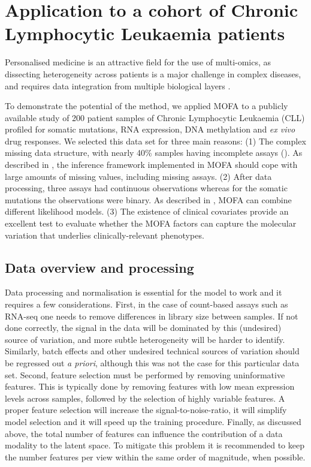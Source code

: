 \newpage

\section{Application to a cohort of Chronic Lymphocytic Leukaemia patients} \label{section:mofa_cll}

Personalised medicine is an attractive field for the use of multi-omics, as dissecting heterogeneity across patients is a major challenge in complex diseases, and requires data integration from multiple biological layers \cite{Chen2013,Costello2014,Alyass2015}.

To demonstrate the potential of the method, we applied MOFA to a publicly available study of 200 patient samples of Chronic Lymphocytic Leukaemia (CLL) profiled for somatic mutations, RNA expression, DNA methylation and \textit{ex vivo} drug responses\cite{Dietrich2018}. We selected this data set for three main reasons: (1) The complex missing data structure, with nearly 40\% samples having incomplete assays (). As described in , the inference framework implemented in MOFA should cope with large amounts of missing values, including missing assays. (2) After data processing, three assays had continuous observations whereas for the somatic mutations the observations were binary. As described in , MOFA can combine different likelihood models. (3) The existence of clinical covariates provide an excellent test to evaluate whether the MOFA factors can capture the molecular variation that underlies clinically-relevant phenotypes.

\subsection{Data overview and processing}

Data processing and normalisation is essential for the model to work and it requires a few considerations. First, in the case of count-based assays such as RNA-seq one needs to remove differences in library size between samples. If not done correctly, the signal in the data will be dominated by this (undesired) source of variation, and more subtle heterogeneity will be harder to identify. Similarly, batch effects and other undesired technical sources of variation should be regressed out \textit{a priori}, although this was not the case for this particular data set. Second, feature selection must be performed by removing uninformative features. This is typically done by removing features with low mean expression levels across samples, followed by the selection of highly variable features. A proper feature selection will increase the signal-to-noise-ratio, it will simplify model selection and it will speed up the training procedure.  Finally, as discussed above, the total number of features can influence the contribution of a data modality to the latent space. To mitigate this problem it is recommended to keep the number features per view within the same order of magnitude, when possible.

